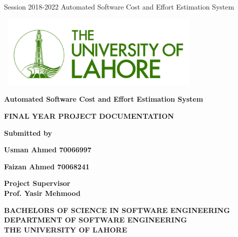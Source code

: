 \documentclass{article}
\begin{document}
	
	\begin{center}

		Session 2018-2022
		\hfill
		Automated Software Cost and Effort Estimation System

		\vspace{10mm}

		\includegraphics[height=3.5cm, width=10cm]{logo} \\

		\vspace{10mm}
		
		\Huge{\textbf{Automated Software Cost and Effort Estimation System}} \\
		
		\vspace{10mm}
		
		\huge{\textbf{FINAL YEAR PROJECT DOCUMENTATION}} \\
		
		\vspace{20mm}
		
		\Large{\textbf{Submitted by}} \\
		
		\vspace{15mm}
		
		\Large{\textbf{Usman Ahmed \hspace{3cm} 70066997}}
		
		\vspace{1mm}
		
		\Large{\textbf{Faizan Ahmed \hspace{3cm} 70068241}}

		\vspace{10mm}

		\Large{\textbf{Project Supervisor}} \\
		\vspace{3mm}
		\Large{\textbf{Prof. Yasir Mehmood}}

		\vspace{15mm}


		\Large{\textbf{BACHELORS OF SCIENCE IN SOFTWARE ENGINEERING}} \\
		\vspace{10mm}
		\Large{\textbf{DEPARTMENT OF SOFTWARE ENGINEERING}} \\
		\vspace{3mm}
		\Large{\textbf{THE UNIVERSITY OF LAHORE}} \\
		

		
		

		
	\end{center}
\end{document}

